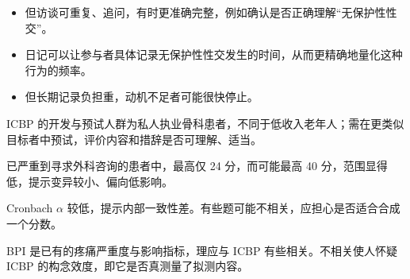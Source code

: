 \begin{answerlist}
\begin{itemize}
\item 但访谈可重复、追问，有时更准确完整，例如确认是否正确理解“无保护性性交”。
\item 日记可以让参与者具体记录无保护性性交发生的时间，从而更精确地量化这种行为的频率。
\item 但长期记录负担重，动机不足者可能很快停止。
\end{itemize}
\item[4a.] ICBP 的开发与预试人群为私人执业骨科患者，不同于低收入老年人；需在更类似目标者中预试，评价内容和措辞是否可理解、适当。
\item[4b.] 已严重到寻求外科咨询的患者中，最高仅 24 分，而可能最高 40 分，范围显得低，提示变异较小、偏向低影响。
\item[4c.] Cronbach $\alpha$ 较低，提示内部一致性差。有些题可能不相关，应担心是否适合合成一个分数。
\item[4d.] BPI 是已有的疼痛严重度与影响指标，理应与 ICBP 有些相关。不相关使人怀疑 ICBP 的构念效度，即它是否真测量了拟测内容。
\end{answerlist}

